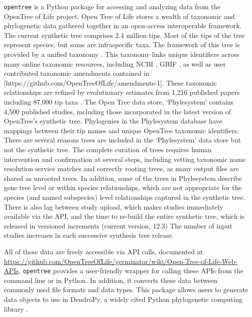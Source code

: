 \documentclass[oupdraft]{sysbio_sse}
\begin{document}
\texttt{opentree} is a Python package for accessing and analyzing data from the OpenTree of Life project.
Open Tree of Life stores a wealth of taxonomic and phylogenetic data gathered together in an open-access interoperable framework.
The current synthetic tree \citep{opentreeoflife_open_2019} comprises 2.4 million tips.
Most of the tips of the tree represent species, but some are infraspecific taxa.
The framework of this tree is provided by a unified taxonomy \citep{opentreeoflife_open_2019-1, rees_automated_2017}.
This taxonomy links unique identifiers across many online taxonomic resources, including NCBI \citep{federhen_ncbi_2012}, GBIF \citep{gbif_secretariat_gbif_2019}, as well as user contributed taxonomic amendments contained in [https://github.com/OpenTreeOfLife/amendments-1].
These taxonomic relationships are refined by evolutionary estimates from 1,216 published papers including 87,000 tip taxa \citep{opentreeoflife_open_2019, redelings_supertree_2017}.
The Open Tree data store, `Phylesystem' \citep{mctavish_phylesystem_2015} contains 4,500 published studies, including those incorporated in the latest version of OpenTree's synthetic tree.
Phylogenies in the Phylesystem database have mappings between their tip names and unique OpenTree taxonomic identifiers.
There are several reasons trees are included in the `Phylesystem' data store but not the synthetic tree.
The complete curation of trees requires human intervention and confirmation at several steps, including vetting taxonomic name resolution service matches and correctly rooting trees, as many output files are shared as unrooted trees.
In addition, some of the trees in Phylesystem describe gene tree level or within species relationships, which are not appropriate for the species (and named subspecies) level relationships captured in the synthetic tree.
There is also lag between study upload, which makes studies immediately available via the API, and the time to re-build the entire synthetic tree, which is released in versioned increments (current version, 12.3)
The number of input studies increases in each successive synthesis tree release.

All of these data are freely accessible via API calls, documented at \url{https://github.com/OpenTreeOfLife/germinator/wiki/Open-Tree-of-Life-Web-APIs}.
\texttt{opentree} provides a user-friendly wrapper for calling these APIs from the command line or in Python.
In addition, it converts these data between commonly used file formats and data types.
This package allows users to generate data objects to use in DendroPy, a widely cited Python phylogenetic computing library \citep{sukumaran_dendropy_2010}.
\end{document}

